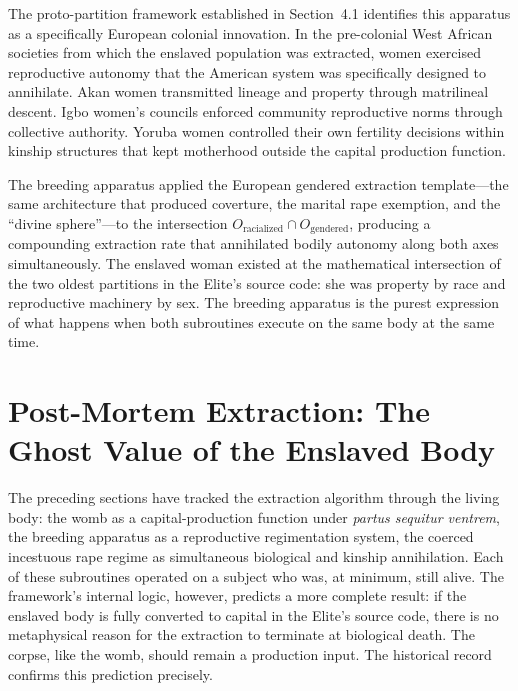 The proto-partition framework established in Section~4.1 identifies this apparatus as a specifically European colonial innovation. In the pre-colonial West African societies from which the enslaved population was extracted, women exercised reproductive autonomy that the American system was specifically designed to annihilate. Akan women transmitted lineage and property through matrilineal descent. Igbo women's councils enforced community reproductive norms through collective authority. Yoruba women controlled their own fertility decisions within kinship structures that kept motherhood outside the capital production function.

The breeding apparatus applied the European gendered extraction template---the same architecture that produced coverture, the marital rape exemption, and the ``divine sphere''---to the intersection $O_{\text{racialized}} \cap O_{\text{gendered}}$, producing a compounding extraction rate that annihilated bodily autonomy along both axes simultaneously. The enslaved woman existed at the mathematical intersection of the two oldest partitions in the Elite's source code: she was property by race and reproductive machinery by sex. The breeding apparatus is the purest expression of what happens when both subroutines execute on the same body at the same time.

\section{Post-Mortem Extraction: The Ghost Value of the Enslaved Body}
\label{sec:post_mortem_extraction}

The preceding sections have tracked the extraction algorithm through the living body: the womb as a capital-production function under \textit{partus sequitur ventrem}, the breeding apparatus as a reproductive regimentation system, the coerced incestuous rape regime as simultaneous biological and kinship annihilation. Each of these subroutines operated on a subject who was, at minimum, still alive. The framework's internal logic, however, predicts a more complete result: if the enslaved body is fully converted to capital in the Elite's source code, there is no metaphysical reason for the extraction to terminate at biological death. The corpse, like the womb, should remain a production input. The historical record confirms this prediction precisely.

